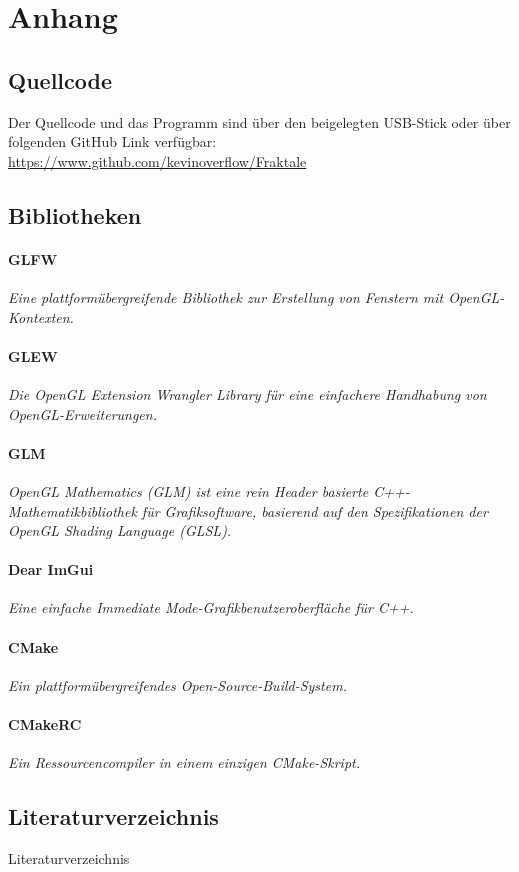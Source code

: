 \titlespacing*{\chapter}{0pt}{-30pt}{20pt}

\chapter{Anhang}
\thispagestyle{fancy} %

\section{Quellcode}
Der Quellcode und das Programm sind über den beigelegten USB-Stick oder über
folgenden GitHub Link verfügbar: \newline
\url{https://www.github.com/kevinoverflow/Fraktale}
\section{Bibliotheken}
\subsubsection*{GLFW}
\textit{Eine plattformübergreifende Bibliothek zur Erstellung von Fenstern mit OpenGL-Kontexten.}
\subsubsection*{GLEW}
\textit{Die OpenGL Extension Wrangler Library für eine einfachere Handhabung von OpenGL-Erweiterungen.}
\subsubsection*{GLM}
\textit{OpenGL Mathematics (GLM) ist eine rein Header basierte C++-Mathematikbibliothek für Grafiksoftware, basierend auf den Spezifikationen der OpenGL Shading Language (GLSL).}
\subsubsection*{Dear ImGui}
\textit{Eine einfache Immediate Mode-Grafikbenutzeroberfläche für C++.}
\subsubsection*{CMake}
\textit{Ein plattformübergreifendes Open-Source-Build-System.}
\subsubsection*{CMakeRC}
\textit{Ein Ressourcencompiler in einem einzigen CMake-Skript.}

\section{Literaturverzeichnis}
Literaturverzeichnis